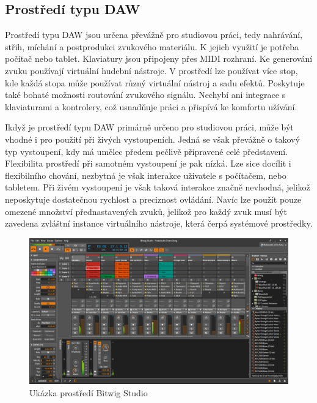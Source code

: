 \documentclass[thesis=M,czech]{FITthesis}[2019/03/06]
\begin{document}
		\subsection{Prostředí typu DAW}
			Prostředí typu DAW jsou určena převážně pro studiovou práci, tedy nahrávání, střih, míchání a postprodukci zvukového materiálu.
			K jejich využití je potřeba počítač nebo tablet. Klaviatury jsou připojeny přes MIDI rozhraní. Ke generování zvuku používají virtuální hudební nástroje.
			V prostředí lze používat více stop, kde každá stopa může používat různý virtuální nástroj a sadu efektů.
			Poskytuje také bohaté možnosti routování zvukového signálu.
			Nechybí ani integrace s klaviaturami a kontrolery, což usnadňuje práci a přispívá ke komfortu užívání.
			
			Ikdyž je prostředí typu DAW primárně určeno pro studiovou práci, může být vhodné i pro použití při živých vystoupeních.
			Jedná se však převážně o takový typ vystoupení, kdy má umělec předem pečlivě připravené celé představení.
			Flexibilita prostředí při samotném vystoupení je pak nízká.
			Lze sice docílit i flexibilního chování, nezbytná je však interakce uživatele s počítačem, nebo tabletem. Při živém vystoupení
			je však taková interakce značně nevhodná, jelikož neposkytuje dostatečnou rychlost a preciznost ovládání.
			Navíc lze použít pouze omezené množství přednastavených zvuků, jelikož pro každý zvuk musí být zavedena zvláštní instance
			virtuálního nástroje, která čerpá systémové prostředky.
			
			\begin{figure}[H]
				\centering
				\includegraphics[width=1\textwidth]{DAW}
				\caption{Ukázka prostředí Bitwig Studio}\label{fig:DAW}
			\end{figure}
			
\clearpage
\end{document}

